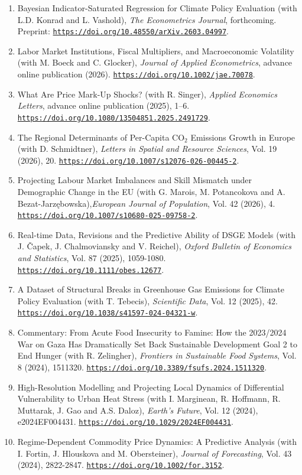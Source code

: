 \documentclass[10pt]{res} %
\newcommand{\doiurl}[1]{\href{https://doi.org/#1}{\nolinkurl{https://doi.org/#1}}}
\begin{document}
\begin{resume}
\begin{enumerate}
\itemsep -1pt
\item Bayesian Indicator-Saturated Regression for Climate Policy Evaluation (with L.D. Konrad and L. Vashold), \textit{The Econometrics Journal}, forthcoming. Preprint: \doiurl{10.48550/arXiv.2603.04997}.
\item Labor Market Institutions, Fiscal Multipliers, and
Macroeconomic Volatility (with M. Boeck and C. Glocker), \textit{Journal of Applied Econometrics}, advance online publication (2026). \doiurl{10.1002/jae.70078}.
\item What Are Price Mark-Up Shocks? (with R. Singer), \textit{Applied Economics Letters}, advance online publication (2025), 1--6. \doiurl{10.1080/13504851.2025.2491729}.
\item The Regional Determinants of Per-Capita CO$_2$ Emissions Growth in Europe (with D. Schmidtner), \textit{Letters in Spatial and Resource Sciences}, Vol. 19 (2026), 20. \doiurl{10.1007/s12076-026-00445-2}.
\item Projecting Labour Market Imbalances and Skill Mismatch under Demographic Change in the EU (with G. Marois, M. Potancokova and A. Bezat-Jarzębowska),\textit{European Journal of Population}, Vol. 42 (2026), 4. \doiurl{10.1007/s10680-025-09758-2}.
\item Real-time Data, Revisions and the Predictive Ability of DSGE Models (with J. \v{C}apek, J. Chalmoviansky and V. Reichel), \textit{Oxford Bulletin of Economics and Statistics}, Vol. 87 (2025), 1059-1080. \doiurl{10.1111/obes.12677}.
\item A Dataset of Structural Breaks in Greenhouse Gas Emissions for Climate Policy Evaluation (with T. Tebecis), \textit{Scientific Data}, Vol. 12 (2025), 42. \doiurl{10.1038/s41597-024-04321-w}.
\item Commentary: From Acute Food Insecurity to Famine: How the 2023/2024 War on Gaza Has Dramatically Set Back Sustainable Development Goal 2 to End Hunger (with R. Zelingher), \textit{Frontiers in Sustainable Food Systems}, Vol. 8 (2024), 1511320. \doiurl{10.3389/fsufs.2024.1511320}.
\item High-Resolution Modelling and Projecting Local Dynamics of Differential Vulnerability to Urban Heat Stress (with I. Marginean, R. Hoffmann, R. Muttarak, J. Gao and A.S. Daloz), \textit{Earth's Future}, Vol. 12 (2024), 
e2024EF004431. \doiurl{10.1029/2024EF004431}.
\item Regime-Dependent Commodity Price Dynamics: A Predictive Analysis (with I. Fortin, J. Hlouskova and M. Obersteiner), \textit{Journal of Forecasting}, Vol. 43 (2024), 2822-2847. \doiurl{10.1002/for.3152}.

\end{enumerate}
\end{resume}
\end{document}
